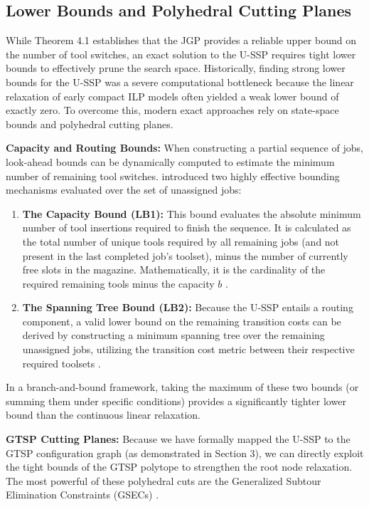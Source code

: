 \documentclass[12pt]{article}
\begin{document}
\subsection{Lower Bounds and Polyhedral Cutting Planes}

While Theorem 4.1 establishes that the JGP provides a reliable upper bound on the number of tool switches, an exact solution to the U-SSP requires tight lower bounds to effectively prune the search space. Historically, finding strong lower bounds for the U-SSP was a severe computational bottleneck because the linear relaxation of early compact ILP models often yielded a weak lower bound of exactly zero. To overcome this, modern exact approaches rely on state-space bounds and polyhedral cutting planes.

\textbf{Capacity and Routing Bounds:} When constructing a partial sequence of jobs, look-ahead bounds can be dynamically computed to estimate the minimum number of remaining tool switches. \cite{Laporte2004} introduced two highly effective bounding mechanisms evaluated over the set of unassigned jobs:
\begin{enumerate}
	\item \textbf{The Capacity Bound (LB1):} This bound evaluates the absolute minimum number of tool insertions required to finish the sequence. It is calculated as the total number of unique tools required by all remaining jobs (and not present in the last completed job's toolset), minus the number of currently free slots in the magazine. Mathematically, it is the cardinality of the required remaining tools minus the capacity $b$ \cite{Laporte2004}.
	\item \textbf{The Spanning Tree Bound (LB2):} Because the U-SSP entails a routing component, a valid lower bound on the remaining transition costs can be derived by constructing a minimum spanning tree over the remaining unassigned jobs, utilizing the transition cost metric between their respective required toolsets \cite{Laporte2004}. 
\end{enumerate}
In a branch-and-bound framework, taking the maximum of these two bounds (or summing them under specific conditions) provides a significantly tighter lower bound than the continuous linear relaxation.

\textbf{GTSP Cutting Planes:} Because we have formally mapped the U-SSP to the GTSP configuration graph (as demonstrated in Section 3), we can directly exploit the tight bounds of the GTSP polytope to strengthen the root node relaxation. The most powerful of these polyhedral cuts are the Generalized Subtour Elimination Constraints (GSECs) \cite{Fischetti1997}. 
\end{document}
